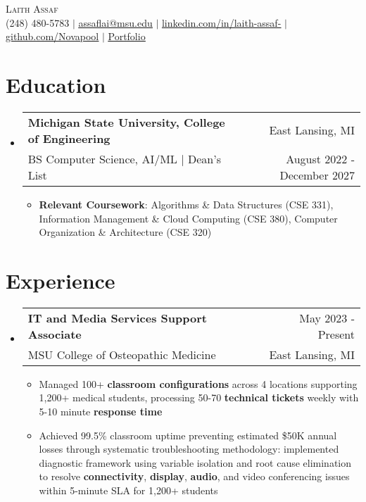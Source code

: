 \documentclass[letterpaper,11pt]{article}
\makeatletter
\newcommand{\resumeItem}[1]{
  \item\small{
    {#1 \vspace{-2pt}}
  }
}
\newcommand{\resumeSubheading}[4]{
  \vspace{-2pt}\item
    \begin{tabular*}{0.97\textwidth}[t]{l@{\extracolsep{\fill}}r}
      \textbf{#1} & \small #2 \\
      \small#3 & \small #4 \\
    \end{tabular*}\vspace{-7pt}
}
\newcommand{\resumeSubHeadingListStart}{\begin{itemize}[leftmargin=0.15in, label={}]}
\newcommand{\resumeSubHeadingListEnd}{\end{itemize}}
\newcommand{\resumeItemListStart}{\begin{itemize}}
\newcommand{\resumeItemListEnd}{\end{itemize}\vspace{-5pt}}
\makeatother
\begin{document}
\begin{center}
    {\Huge \scshape Laith Assaf} \\ \vspace{1pt}
    \small (248) 480-5783 $|$ \href{mailto:assaflai@msu.edu}{\underline{assaflai@msu.edu}} $|$ 
    \href{https://linkedin.com/in/laith-assaf/}{\underline{linkedin.com/in/laith-assaf-}} $|$
    \href{https://github.com/Novapool}{\underline{github.com/Novapool}} $|$
    \href{https://resume-website-eight-psi.vercel.app/}{\underline{Portfolio}}
\end{center}

\section{Education}
  \resumeSubHeadingListStart
    \resumeSubheading
      {Michigan State University, College of Engineering}{East Lansing, MI}
      {BS Computer Science, AI/ML $|$ Dean's List}{August 2022 - December 2027}
      \resumeItemListStart
        \resumeItem{\textbf{Relevant Coursework}: Algorithms \& Data Structures (CSE 331), Information Management \& Cloud Computing (CSE 380), Computer Organization \& Architecture (CSE 320)}
      \resumeItemListEnd
  \resumeSubHeadingListEnd

\section{Experience}
  \resumeSubHeadingListStart

    \resumeSubheading
      {IT and Media Services Support Associate}{May 2023 - Present}
      {MSU College of Osteopathic Medicine}{East Lansing, MI}
      \resumeItemListStart
        \resumeItem{Managed 100+ \textbf{classroom configurations} across 4 locations supporting 1,200+ medical students, processing 50-70 \textbf{technical tickets} weekly with 5-10 minute \textbf{response time}}
        \resumeItem{Achieved 99.5\% classroom uptime preventing estimated \$50K annual losses through systematic troubleshooting methodology: implemented diagnostic framework using variable isolation and root cause elimination to resolve \textbf{connectivity}, \textbf{display}, \textbf{audio}, and video conferencing issues within 5-minute SLA for 1,200+ students}
      \resumeItemListEnd

  \resumeSubHeadingListEnd

\end{document}
